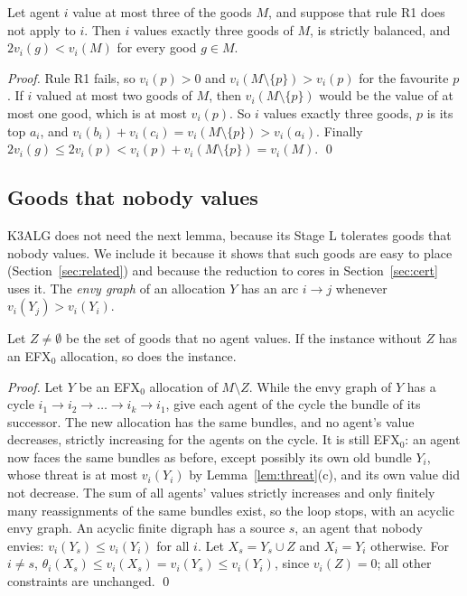 \documentclass[runningheads,11pt]{llncs}
\newcommand{\efxz}{\texorpdfstring{\mbox{EFX$_0$}}{EFX0}}
\begin{document}
\begin{lemma}\label{lem:R1fail}
Let agent $i$ value at most three of the goods $M$, and suppose that rule R1 does not apply to $i$. Then $i$ values exactly three goods of $M$, is strictly balanced, and $2v_i(g)<v_i(M)$ for every good $g\in M$.
\end{lemma}

\begin{proof}
Rule R1 fails, so $v_i(p)>0$ and $v_i(M\setminus\{p\})>v_i(p)$ for the favourite $p$. If $i$ valued at most two goods of $M$, then $v_i(M\setminus\{p\})$ would be the value of at most one good, which is at most $v_i(p)$. So $i$ values exactly three goods, $p$ is its top $a_i$, and $v_i(b_i)+v_i(c_i)=v_i(M\setminus\{p\})>v_i(a_i)$. Finally $2v_i(g)\le2v_i(p)<v_i(p)+v_i(M\setminus\{p\})=v_i(M)$. \qed
\end{proof}

\subsection{Goods that nobody values}\label{sec:junklemma}

K3ALG does not need the next lemma, because its Stage L tolerates goods that nobody values. We include it because it shows that such goods are easy to place (Section~\ref{sec:related}) and because the reduction to cores in Section~\ref{sec:cert} uses it. The \emph{envy graph} of an allocation $Y$ has an arc $i\to j$ whenever $v_i(Y_j)>v_i(Y_i)$.

\begin{lemma}\label{lem:junk}
Let $Z\ne\emptyset$ be the set of goods that no agent values. If the instance without $Z$ has an \efxz{} allocation, so does the instance.
\end{lemma}

\begin{proof}
Let $Y$ be an \efxz{} allocation of $M\setminus Z$. While the envy graph of $Y$ has a cycle $i_1\to i_2\to\dots\to i_k\to i_1$, give each agent of the cycle the bundle of its successor. The new allocation has the same bundles, and no agent's value decreases, strictly increasing for the agents on the cycle. It is still \efxz{}: an agent now faces the same bundles as before, except possibly its own old bundle $Y_i$, whose threat is at most $v_i(Y_i)$ by Lemma~\ref{lem:threat}(c), and its own value did not decrease. The sum of all agents' values strictly increases and only finitely many reassignments of the same bundles exist, so the loop stops, with an acyclic envy graph. An acyclic finite digraph has a source $s$, an agent that nobody envies: $v_i(Y_s)\le v_i(Y_i)$ for all $i$. Let $X_s=Y_s\cup Z$ and $X_i=Y_i$ otherwise. For $i\ne s$, $\theta_i(X_s)\le v_i(X_s)=v_i(Y_s)\le v_i(Y_i)$, since $v_i(Z)=0$; all other constraints are unchanged. \qed
\end{proof}
\end{document}

